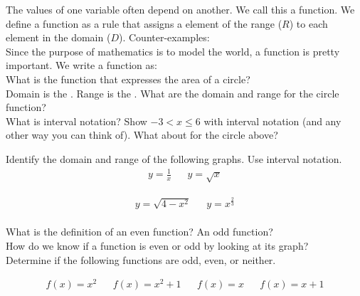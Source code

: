 \documentclass[11pt]{article}
\begin{document}
    \noindent The values of one variable often depend on another. We call this a function. We define a function as a rule that assigns a \underline{\hspace{2cm}} element of the range ($R$) to each element in the domain ($D$). Counter-examples:\\[2ex]

    \noindent Since the purpose of mathematics is to model the world, a function is pretty important. We write a function as:\\[2ex]

    \noindent What is the function that expresses the area of a circle?\\[2ex]

    \noindent Domain is the \underline{\hspace{2cm}}. Range is the \underline{\hspace{2cm}}. What are the domain and range for the circle function?\\[2ex]

    \noindent What is interval notation? Show $\displaystyle -3 < x \le 6$ with interval notation (and any other way you can think of). What about for the circle above?

    \noindent Identify the domain and range of the following graphs. Use interval notation.\\[1ex]

    \begin{align*}
        y=\frac{1}{x} &  & y=\sqrt{x}
    \end{align*}

    \vspace{1ex}

    \begin{align*}
        y=\sqrt{4-x^2} &  & y=x^\frac{2}{3}
    \end{align*}\\[2ex]

    \noindent What is the definition of an even function? An odd function?\\[2ex]

    \noindent How do we know if a function is even or odd by looking at its graph?\\[2ex]

    \noindent Determine if the following functions are odd, even, or neither.

    \begin{align*}
        f(x) = x^2 &  & f(x) = x^2 + 1 &  & f(x) = x &  & f(x) = x + 1
    \end{align*}
\end{document}
